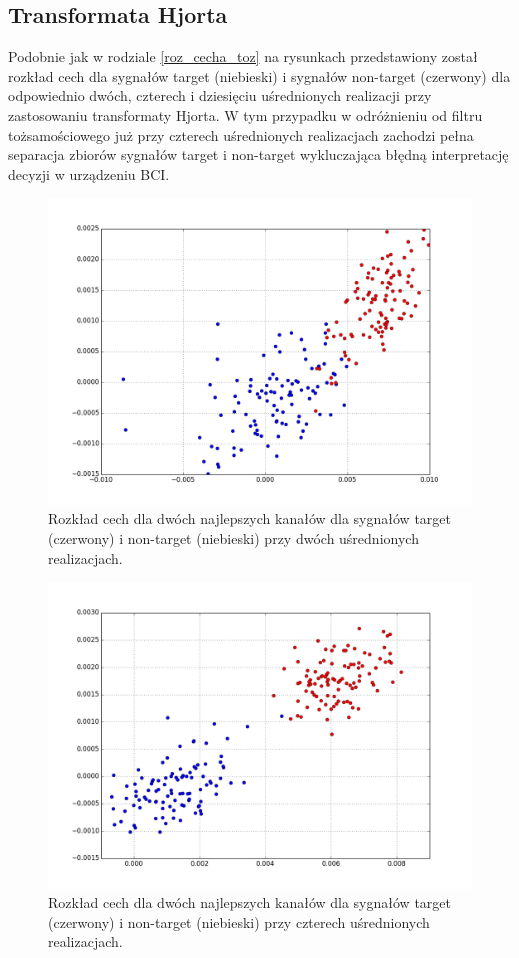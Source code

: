 \documentclass[licencjacka,openright]{pracamgr}
\begin{document}
\subsection{Transformata Hjorta}
\label{roz_cecha_hjorth}
Podobnie jak w rodziale \ref{roz_cecha_toz} na rysunkach przedstawiony został rozkład cech dla sygnałów target (niebieski) i sygnałów non-target (czerwony) dla odpowiednio dwóch, czterech i dziesięciu uśrednionych realizacji przy zastosowaniu transformaty Hjorta. W tym przypadku w odróżnieniu od filtru tożsamościowego już przy czterech uśrednionych realizacjach zachodzi pełna separacja zbiorów sygnałów target i non-target wykluczająca błędną interpretację decyzji w urządzeniu BCI.


\begin{figure}[H]
\centering
\includegraphics[scale=0.55, trim=10mm 15mm 10mm 18mm, clip=True]{pics/cecha_hjorth_2.png}
\caption{Rozkład cech dla dwóch najlepszych kanałów dla sygnałów target (czerwony) i non-target (niebieski) przy dwóch uśrednionych realizacjach.}
\label{cecha_hjorth_2}
\end{figure}

\begin{figure}[H]
\centering
\includegraphics[scale=0.55, trim=10mm 15mm 10mm 18mm, clip=True]{pics/cecha_hjorth_4.png}
\caption{Rozkład cech dla dwóch najlepszych kanałów dla sygnałów target (czerwony) i non-target (niebieski) przy czterech uśrednionych realizacjach.}
\label{cecha_hjorth_4}
\end{figure}
\end{document}
